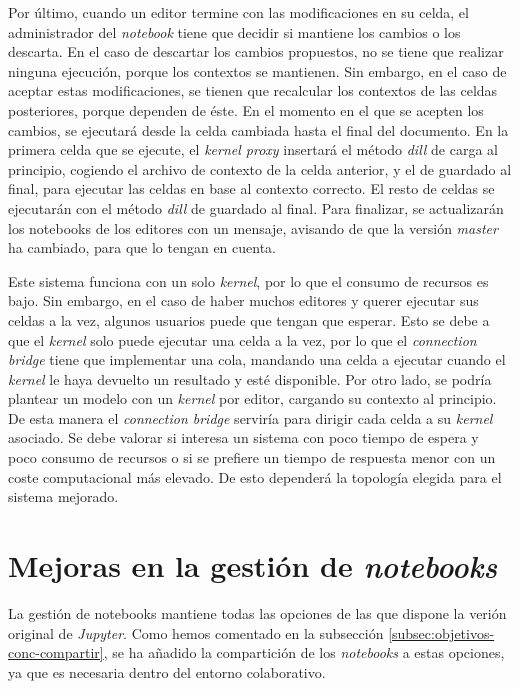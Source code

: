 \documentclass[11pt,spanish,listoffigures]{tfgetsinf}
\begin{document}
Por último, cuando un editor termine con las modificaciones en su celda, el administrador del \textit{notebook} tiene que decidir si mantiene los cambios o los descarta. En el caso de descartar los cambios propuestos, no se tiene que realizar ninguna ejecución, porque los contextos se mantienen. Sin embargo, en el caso de aceptar estas modificaciones, se tienen que recalcular los contextos de las celdas posteriores, porque dependen de éste. En el momento en el que se acepten los cambios, se ejecutará desde la celda cambiada hasta el final del documento.  En la primera celda que se ejecute, el \textit{kernel proxy} insertará el método \textit{dill} de carga al principio, cogiendo el archivo de contexto de la celda anterior, y el de guardado al final, para ejecutar las celdas en base al contexto correcto. El resto de celdas se ejecutarán con el método \textit{dill} de guardado al final. Para finalizar, se actualizarán los notebooks de los editores con un mensaje, avisando de que la versión \textit{master} ha cambiado, para que lo tengan en cuenta.

Este sistema funciona con un solo \textit{kernel}, por lo que el consumo de recursos es bajo. Sin embargo, en el caso de haber muchos editores y querer ejecutar sus celdas a la vez, algunos usuarios puede que tengan que esperar. Esto se debe a que el \textit{kernel} solo puede ejecutar una celda a la vez, por lo que el \textit{connection bridge} tiene que implementar una cola, mandando una celda a ejecutar cuando el \textit{kernel} le haya devuelto un resultado y esté disponible. Por otro lado, se podría plantear un modelo con un \textit{kernel} por editor, cargando su contexto al principio. De esta manera el \textit{connection bridge} serviría para dirigir cada celda a su \textit{kernel} asociado. Se debe valorar si interesa un sistema con poco tiempo de espera y poco consumo de recursos o si se prefiere un tiempo de respuesta menor con un coste computacional más elevado. De esto dependerá la topología elegida para el sistema mejorado.


\section{Mejoras en la gestión de \textit{notebooks}}
\label{sec:mejoras-gestión}

La gestión de notebooks mantiene todas las opciones de las que dispone la verión original de \textit{Jupyter}. Como hemos comentado en la subsección \ref{subsec:objetivos-conc-compartir}, se ha añadido la compartición de los \textit{notebooks} a estas opciones, ya que es necesaria dentro del entorno colaborativo. 
\end{document}
